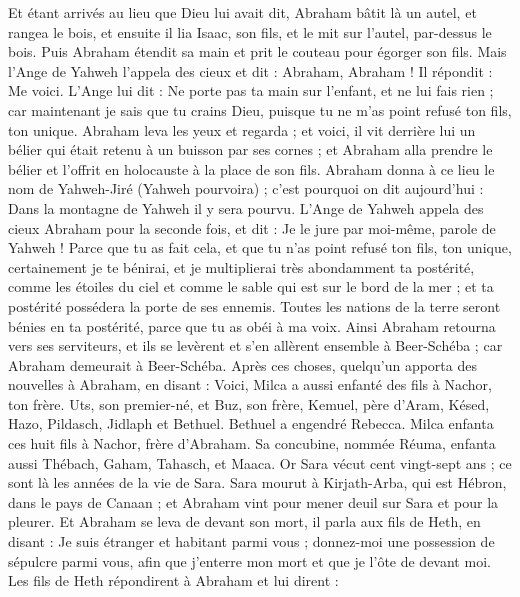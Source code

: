 \begin{multicols}{2}
Et étant arrivés au lieu que Dieu lui avait dit, Abraham bâtit là un autel, et rangea le bois, et ensuite il lia Isaac, son fils, et le mit sur l'autel, par-dessus le bois.
Puis Abraham étendit sa main et prit le couteau pour égorger son fils.
Mais l'Ange de Yahweh l'appela des cieux et dit : Abraham, Abraham ! Il répondit : Me voici.
L'Ange lui dit : Ne porte pas ta main sur l'enfant, et ne lui fais rien ; car maintenant je sais que tu crains Dieu, puisque tu ne m'as point refusé ton fils, ton unique.
Abraham leva les yeux et regarda ; et voici, il vit derrière lui un bélier qui était retenu à un buisson par ses cornes ; et Abraham alla prendre le bélier et l'offrit en holocauste à la place de son fils.
Abraham donna à ce lieu le nom de Yahweh-Jiré (Yahweh pourvoira) ; c'est pourquoi on dit aujourd'hui : Dans la montagne de Yahweh il y sera pourvu.
L'Ange de Yahweh appela des cieux Abraham pour la seconde fois,
et dit : Je le jure par moi-même, parole de Yahweh ! Parce que tu as fait cela, et que tu n'as point refusé ton fils, ton unique,
certainement je te bénirai, et je multiplierai très abondamment ta postérité, comme les étoiles du ciel et comme le sable qui est sur le bord de la mer ; et ta postérité possédera la porte de ses ennemis.
Toutes les nations de la terre seront bénies en ta postérité, parce que tu as obéi à ma voix.
Ainsi Abraham retourna vers ses serviteurs, et ils se levèrent et s'en allèrent ensemble à Beer-Schéba ; car Abraham demeurait à Beer-Schéba.
Après ces choses, quelqu'un apporta des nouvelles à Abraham, en disant : Voici, Milca a aussi enfanté des fils à Nachor, ton frère.
Uts, son premier-né, et Buz, son frère, Kemuel, père d'Aram,
Késed, Hazo, Pildasch, Jidlaph et Bethuel.
Bethuel a engendré Rebecca. Milca enfanta ces huit fils à Nachor, frère d'Abraham.
Sa concubine, nommée Réuma, enfanta aussi Thébach, Gaham, Tahasch, et Maaca.
\VerseOne{}Or Sara vécut cent vingt-sept ans ; ce sont là les années de la vie de Sara.
Sara mourut à Kirjath-Arba, qui est Hébron, dans le pays de Canaan ; et Abraham vint pour mener deuil sur Sara et pour la pleurer.
Et Abraham se leva de devant son mort, il parla aux fils de Heth, en disant :
Je suis étranger et habitant parmi vous ; donnez-moi une possession de sépulcre parmi vous, afin que j'enterre mon mort et que je l'ôte de devant moi.
Les fils de Heth répondirent à Abraham et lui dirent :

\end{multicols}
